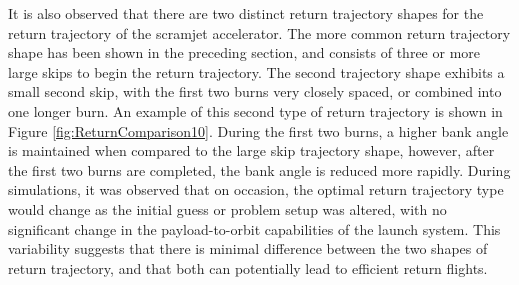 It is also observed that there are two distinct return trajectory shapes for the return trajectory of the scramjet accelerator. The more common return trajectory shape has been shown in the preceding section, and consists of three or more large skips to begin the return trajectory. The second trajectory shape exhibits a small second skip, with the first two burns very closely spaced, or combined into one longer burn. An example of this second type of return trajectory is shown in Figure \ref{fig:ReturnComparison10}. During the first two burns, a higher bank angle is maintained when compared to the large skip trajectory shape, however, after the first two burns are completed, the bank angle is reduced more rapidly. 
During simulations, it was observed that on occasion, the optimal return trajectory type would change as the initial guess or problem setup was altered, with no significant change in the payload-to-orbit capabilities of the launch system. This variability suggests that there is minimal difference between the two shapes of return trajectory, and that both can potentially lead to efficient return flights. 





